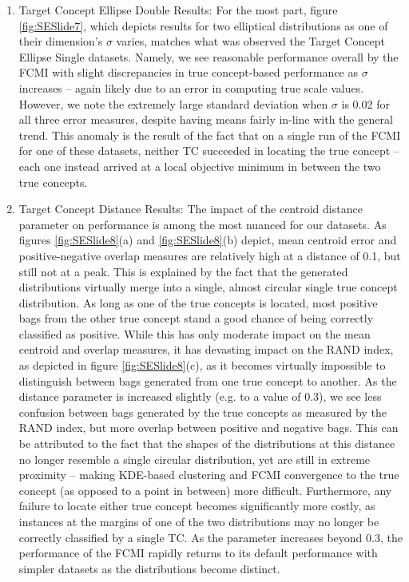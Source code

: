 \documentclass[12pt,dvips]{report}
\numberwithin{equation}{section}
\begin{document}
\begin{enumerate}
\begin{enumerate}
	\item Target Concept Ellipse Double Results: For the most part, figure \ref{fig:SESlide7}, which depicts results for two elliptical distributions as one of their dimension's $\sigma$ varies, matches what was observed the Target Concept Ellipse Single datasets.  Namely, we see reasonable performance overall by the FCMI with slight discrepancies  in true concept-based performance as $\sigma$ increases -- again likely due to an error in computing true scale values.  However, we note the extremely large standard deviation when $\sigma$ is 0.02 for all three error measures, despite having means fairly in-line with the general trend.  This anomaly is the result of the fact that on a single run of the FCMI for one of these datasets, neither TC succeeded in locating the true concept -- each one instead arrived at a local objective minimum in between the two true concepts. 

	\item Target Concept Distance Results: The impact of the centroid distance parameter on performance is among the most nuanced for our datasets.  As figures \ref{fig:SESlide8}(a) and \ref{fig:SESlide8}(b) depict, mean centroid error and positive-negative overlap measures are relatively high at a distance of 0.1, but still not at a peak.  This is explained by the fact that the generated distributions virtually merge into a single, almost circular single true concept distribution.  As long as one of the true concepts is located, most positive bags from the other true concept stand a good chance of being correctly classified as positive.  While this has only moderate impact on the mean centroid and overlap measures, it has devasting impact on the RAND index, as depicted in figure \ref{fig:SESlide8}(c), as it becomes virtually impossible to distinguish between bags generated from one true concept to another.
As the distance parameter is increased slightly (e.g. to a value of 0.3), we see less confusion between bags generated by the true concepts as measured by the RAND index, but more overlap between positive and negative bags.  This can be attributed to the fact that the shapes of the distributions at this distance no longer resemble a single circular distribution, yet are still in extreme proximity -- making KDE-based clustering and FCMI convergence to the true concept (as opposed to a point in between) more difficult. Furthermore, any failure to locate either true concept becomes significantly more costly, as instances at the margins of one of the two distributions may no longer be correctly classified by a single TC.  As the parameter increases beyond 0.3, the performance of the FCMI rapidly returns to its default performance with simpler datasets as the distributions become distinct. 


\end{enumerate}
\end{enumerate}
\end{document}

